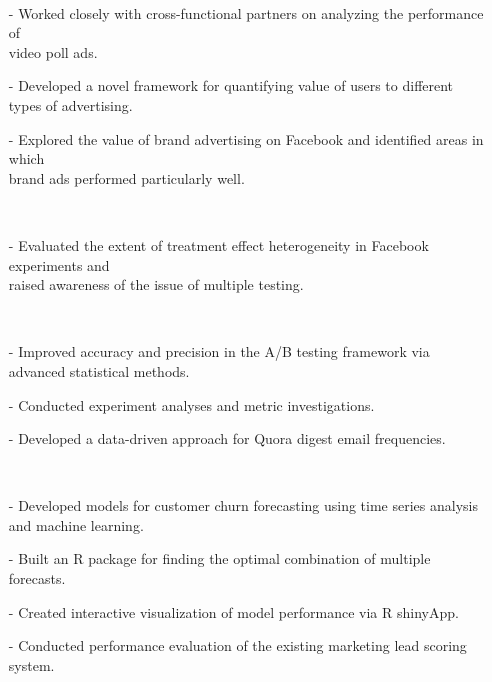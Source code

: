 \documentclass{res}
\begin{document}
\begin{resume}
     \\ 
            \begin{itemize}\setlength\itemsep{0em}
        \item[-] Worked closely with cross-functional partners on analyzing the performance of \\video poll ads. 
\item[-]  Developed a novel framework for quantifying value of users to different types of advertising. 
\item[-] Explored the value of brand advertising on Facebook and identified areas in which \\brand ads performed particularly well. 
        \end{itemize}

     \\ 
            \begin{itemize}\setlength\itemsep{0em}
        \item[-] Evaluated the extent of treatment effect heterogeneity in Facebook experiments and \\raised awareness of the issue of multiple testing.
        \end{itemize}
  
     \\
    \begin{itemize}
     \item[-] Improved accuracy and precision in the A/B testing framework via advanced statistical methods.
     \item[-] Conducted experiment analyses and metric investigations.
     \item[-] Developed a data-driven approach for Quora digest email frequencies.
     \end{itemize}  
   
     \\
    \begin{itemize}
     \item[-] Developed models for customer churn forecasting using time series analysis and machine learning.
     \item[-] Built an R package for finding the optimal combination of multiple forecasts.
     \item[-] Created interactive visualization of model performance via R shinyApp.
     \item[-] Conducted performance evaluation of the existing marketing lead scoring system.
     \end{itemize}
     

\end{resume}
\end{document}
